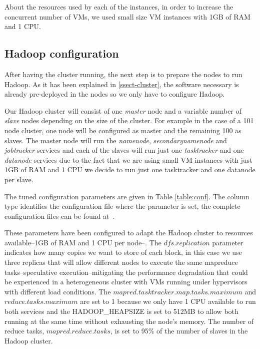 \documentclass[oribibl]{llncs_Ibergrid2013}
\begin{document}
About the resources used by each of the instances, in order to increase the concurrent number of VMs, we used small size VM instances with 1GB of RAM and 1 CPU.


\subsection{Hadoop configuration}
\label{ssect-hadoop}
After having the cluster running, the next step is to prepare the nodes to run Hadoop. As it has been explained in \ref{ssect-cluster}, the software necessary is already pre-deployed in the nodes so we only have to configure Hadoop. 

Our Hadoop cluster will consist of one \emph{master} node and a variable number of \emph{slave} nodes depending on the size of the cluster. For example in the case of a 101 node cluster, one node will be configured as master and the remaining 100 as slaves. The master node will run the \emph{namenode}, \emph{secondarynamenode} and \emph{jobtracker} services and each of the slaves will run just one \emph{tasktracker} and one \emph{datanode} services
due to the fact that we are using small VM instances with just 1GB of RAM and 1 CPU we decide to run just one tasktracker and one datanode per slave. 

 The tuned configuration parameters are given in Table \ref{table:conf}. The column type identifies the configuration file where the parameter is set, the complete configuration files can be found at~\cite{scripts}.

These parameters have been configured to adapt the Hadoop cluster to resources available--1GB of RAM and 1 CPU per node--. The $dfs.replication$ parameter indicates how many copies we want to store of each block, in this case we use three replicas that will allow different nodes to execute the same mapreduce tasks--speculative execution--mitigating the performance degradation that could be experienced in a heterogeneous cluster with VMs running under hypervisors with different load conditions. The $mapred.tasktracker.map.tasks.maximum$ and $reduce.tasks.maximum$ are set to 1 because we only have 1 CPU available to run both services and the HADOOP\_HEAPSIZE is set to 512MB to allow both running at the same time without exhausting the node's memory. The number of reduce tasks, $mapred.reduce.tasks$, is set to 95\% of the number of slaves in the Hadoop cluster. 
\end{document}

